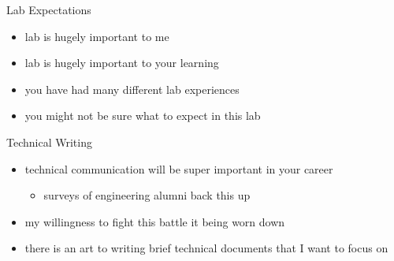 \begin{frame}{Lab Expectations}
\protect\hypertarget{lab-expectations}{}
\begin{itemize}
\tightlist
\item
  lab is hugely important to me
\item
  lab is hugely important to your learning
\item
  you have had many different lab experiences
\item
  you might not be sure what to expect in this lab
\end{itemize}
\end{frame}

\begin{frame}{Technical Writing}
\protect\hypertarget{technical-writing}{}
\begin{itemize}
\tightlist
\item
  technical communication will be super important in your career

  \begin{itemize}
  \tightlist
  \item
    surveys of engineering alumni back this up
  \end{itemize}
\item
  my willingness to fight this battle it being worn down
\item
  there is an art to writing brief technical documents that I want to
  focus on
\end{itemize}
\end{frame}

